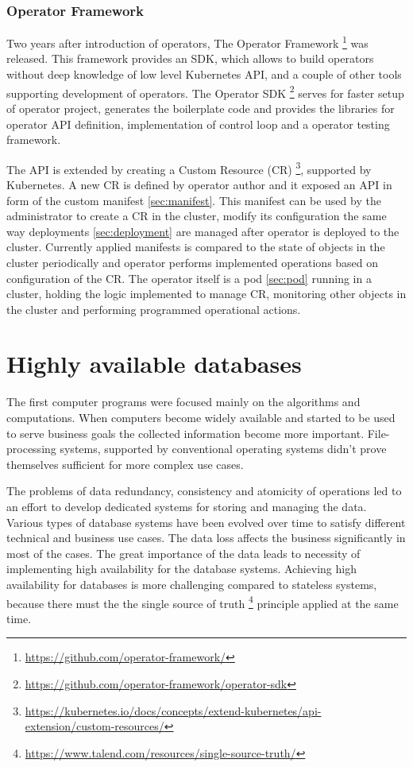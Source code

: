 \documentclass[
  digital, %
  twoside, %
  table,   %
  lof,     %
  lot,     %
]{fithesis3}
\begin{document}
\subsection{Operator Framework}
Two years after introduction of operators, The Operator Framework \footnote{\url{https://github.com/operator-framework/}} was released. This framework provides an SDK, which allows to build operators without deep knowledge of low level Kubernetes API, and a couple of other tools supporting development of operators. The Operator SDK \footnote{\url{https://github.com/operator-framework/operator-sdk}} serves for faster setup of operator project, generates the boilerplate code and provides the libraries for operator API definition, implementation of control loop and a operator testing framework.

The API is extended by creating a Custom Resource (CR) \footnote{\url{https://kubernetes.io/docs/concepts/extend-kubernetes/api-extension/custom-resources/}}, supported by Kubernetes. A new CR is defined by operator author and it exposed an API in form of the custom manifest \ref{sec:manifest}. This manifest can be used by the administrator to create a CR in the cluster, modify its configuration the same way deployments \ref{sec:deployment} are managed after operator is deployed to the cluster. Currently applied manifests is compared to the state of objects in the cluster periodically and operator performs implemented operations based on configuration of the CR. The operator itself is a pod \ref{sec:pod} running in a cluster, holding the logic implemented to manage CR, monitoring other objects in the cluster and performing programmed operational actions.

\chapter{Highly available databases}
The first computer programs were focused mainly on the algorithms and computations. When computers become widely available and started to be used to serve business goals the collected information become more important. File-processing systems, supported by conventional operating systems didn't prove themselves sufficient for more complex use cases.

The problems of data redundancy, consistency and atomicity of operations led to an effort to develop dedicated systems for storing and managing the data. Various types of database systems have been evolved over time to satisfy different technical and business use cases. The data loss affects the business significantly in most of the cases. The great importance of the data leads to necessity of implementing high availability for the database systems. Achieving high availability for databases is more challenging compared to stateless systems, because there must the the single source of truth \footnote{\url{https://www.talend.com/resources/single-source-truth/}} principle applied at the same time.
\end{document}

